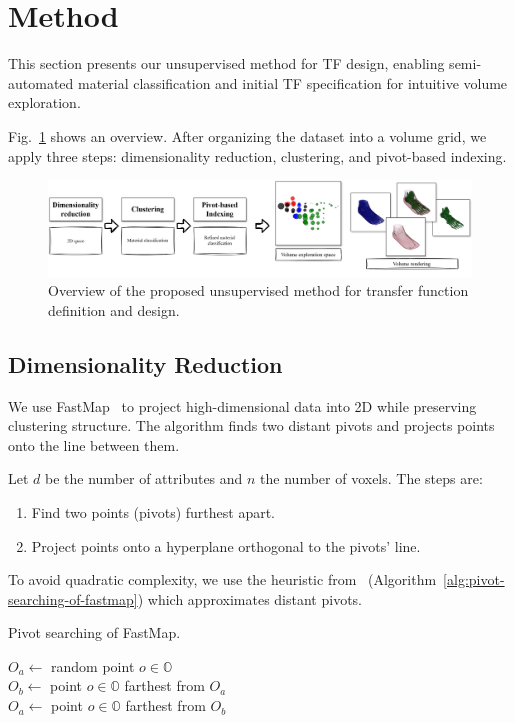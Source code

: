 \section{Method}
\label{sect:method}

This section presents our unsupervised method for TF design, enabling semi-automated material classification and initial TF specification for intuitive volume exploration.

Fig.~\ref{fig:volume-exploration-pipeline} shows an overview. After organizing the dataset into a volume grid, we apply three steps: dimensionality reduction, clustering, and pivot-based indexing.

\begin{figure}[htb!]
    \centering
    \caption{Overview of the proposed unsupervised method for transfer function definition and design.}
    \label{fig:volume-exploration-pipeline}
    \includegraphics[width=\textwidth]{figs/method-overview.jpg}
\end{figure}

\subsection{Dimensionality Reduction}
\label{subsect:feature-extraction}

We use FastMap~\cite{faloutsos1995} to project high-dimensional data into 2D while preserving clustering structure. The algorithm finds two distant pivots and projects points onto the line between them.

Let $d$ be the number of attributes and $n$ the number of voxels. The steps are:
\begin{enumerate}
    \item Find two points (pivots) furthest apart.
    \item Project points onto a hyperplane orthogonal to the pivots’ line.
\end{enumerate}

To avoid quadratic complexity, we use the heuristic from~\cite{faloutsos1995} (Algorithm~\ref{alg:pivot-searching-of-fastmap}) which approximates distant pivots.

\begin{algorithm}
    \caption{Pivot searching of FastMap.}
    \label{alg:pivot-searching-of-fastmap}
    $O_a \gets$ random point $o \in \mathbb{O}$\\
    $O_b \gets$ point $o \in \mathbb{O}$ farthest from $O_a$\\
    $O_a \gets$ point $o \in \mathbb{O}$ farthest from $O_b$
\end{algorithm}

